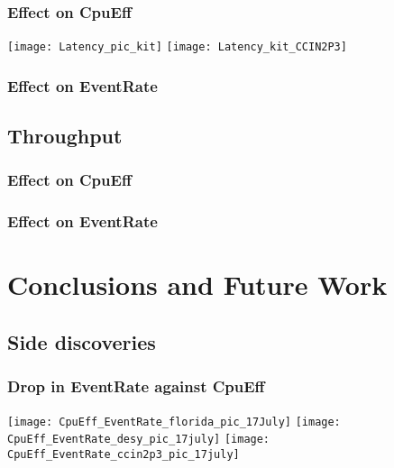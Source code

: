 \documentclass[]{article}
\begin{document}
\subsubsection{Effect on CpuEff}
\texttt{[image: Latency\_pic\_kit]}
\texttt{[image: Latency\_kit\_CCIN2P3]}
\subsubsection{Effect on EventRate}
\subsection{Throughput}
\subsubsection{Effect on CpuEff}
\subsubsection{Effect on EventRate}
\section{Conclusions and Future Work}
\subsection{Side discoveries}
\subsubsection{Drop in EventRate against CpuEff}
\texttt{[image: CpuEff\_EventRate\_florida\_pic\_17July]}
\texttt{[image: CpuEff\_EventRate\_desy\_pic\_17july]}
\texttt{[image: CpuEff\_EventRate\_ccin2p3\_pic\_17july]}
\end{document}
